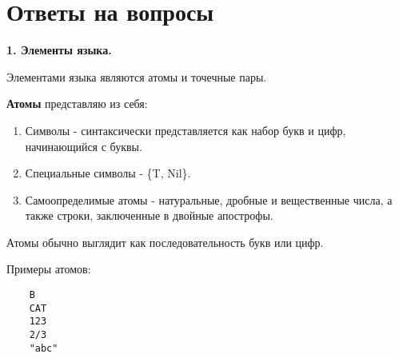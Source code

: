 \section*{Ответы на вопросы}
\setcounter{page}{2}









\textbf{1. Элементы языка.}

Элементами языка являются атомы и точечные пары.

\textbf{Атомы} представляю из себя:
\begin{enumerate}
	\item Символы - синтаксически представляется как набор букв и цифр, начинающийся с буквы.
	\item Специальные символы - \{T, Nil\}.
	\item Самоопределимые атомы - натуральные, дробные и вещественные числа, а также строки, заключенные в двойные апострофы. 
\end{enumerate}

Атомы обычно выглядит как последовательность букв или цифр.

Примеры атомов:
\begin{lstlisting}
	B
	CAT
	123
	2/3
	"abc"
\end{lstlisting}




